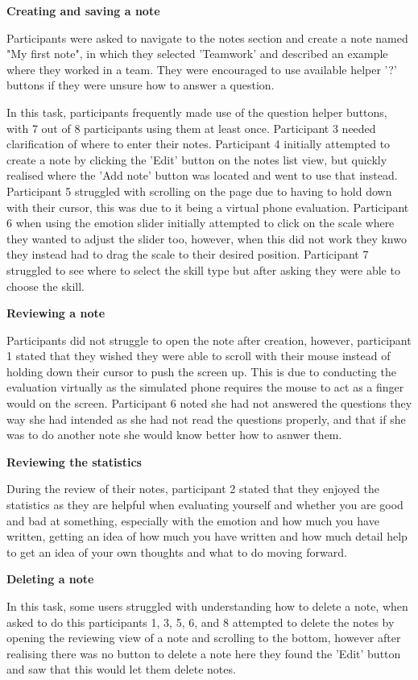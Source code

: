\documentclass{l4proj}
\begin{document}
\textbf{Creating and saving a note}
\par 
Participants were asked to navigate to the notes section and create a note named "My first note", in which they 
selected 'Teamwork' and described an example where they worked in a team. They were encouraged to use available helper '?' 
buttons if they were unsure how to answer a question. 
\par 
In this task, participants frequently made use of the question helper buttons, with 7 out of 8 participants using them
at least once. Participant 3 needed clarification of where to enter their notes. Participant 4 initially attempted
to create a note by clicking the 'Edit' button on the notes list view, but quickly realised where the 'Add note' button
was located and went to use that instead. Participant 5 struggled with scrolling on the page due to having to hold
down with their cursor, this was due to it being a virtual phone evaluation. Participant 6 when using the emotion
slider initially attempted to click on the scale where they wanted to adjust the slider too, however, when this did not 
work they knwo they instead had to drag the scale to their desired position. Participant 7 struggled to see where
to select the skill type but after asking they were able to choose the skill.

\textbf{Reviewing a note}
\par
Participants did not struggle to open the note after creation, however, participant 1 stated that they wished they were able
to scroll with their mouse instead of holding down their cursor to push the screen up. This is due to conducting the 
evaluation virtually as the simulated phone requires the mouse to act as a finger would on the screen. Participant 6 noted 
she had not answered the questions they way she had intended as she had not read the questions properly, and that if she
was to do another note she would know better how to asnwer them.

\textbf{Reviewing the statistics}
\par 
During the review of their notes, participant 2 stated that they enjoyed the statistics as they are helpful when evaluating 
yourself and whether you are good and bad at something, especially with the emotion and how much you have written, getting 
an idea of how much you have written and how much detail help to get an idea of your own thoughts and what to do moving forward.

\textbf{Deleting a note}
\par 
In this task, some users struggled with understanding how to delete a note, when asked to do this participants 1, 3, 5, 6, and 
8 attempted to delete the notes by opening the reviewing view of a note and scrolling to the bottom, however after realising
there was no button to delete a note here they found the 'Edit' button and saw that this would let them delete notes. 
\end{document}
